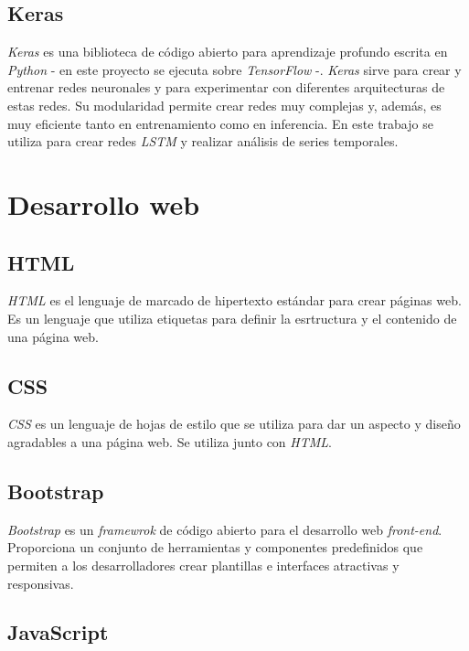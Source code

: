\subsection{Keras}\label{keras}

\emph{Keras} \citep{online:keras} es una biblioteca de código abierto para aprendizaje profundo escrita en \emph{Python} - en este proyecto se ejecuta sobre \emph{TensorFlow} \citep{online:tensorflow} -. \emph{Keras} sirve para crear y entrenar redes neuronales y para experimentar con diferentes arquitecturas de estas redes. Su modularidad permite crear redes muy complejas y, además, es muy eficiente tanto en entrenamiento como en inferencia. En este trabajo se utiliza para crear redes \emph{LSTM} y realizar análisis de series temporales. 


\section{Desarrollo web}\label{desarrollo_web}

\subsection{HTML}\label{html}

\emph{HTML} \citep{wiki:html} es el lenguaje de marcado de hipertexto estándar para crear páginas web. Es un lenguaje que utiliza etiquetas para definir la esrtructura y el contenido de una página web. 

\subsection{CSS}\label{css}

\emph{CSS} \citep{wiki:css} es un lenguaje de hojas de estilo que se utiliza para dar un aspecto y diseño agradables a una página web. Se utiliza junto con \emph{HTML}.

\subsection{Bootstrap}\label{bootstrap}

\emph{Bootstrap} \citep{online:bootstrap} es un \emph{framewrok} de código abierto para el desarrollo web \emph{front-end}. Proporciona un conjunto de herramientas y componentes predefinidos que permiten a los desarrolladores crear plantillas e interfaces atractivas y responsivas. 

\subsection{JavaScript}\label{javascript}

